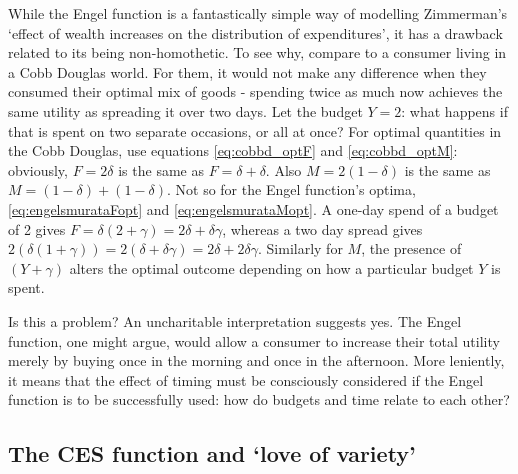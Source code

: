While the Engel function is a fantastically simple way of modelling Zimmerman's `effect of wealth increases on the distribution of expenditures', it has a drawback related to its being non-homothetic.  To see why, compare to a consumer living in a Cobb Douglas world. For them, it would not make any difference when they consumed their optimal mix of goods - spending twice as much now achieves the same utility as spreading it over two days. Let the budget $Y=2$: what happens if that is spent on two separate occasions, or all at once? For optimal quantities in the Cobb Douglas, use equations \eqref{eq:cobbd_optF} and \eqref{eq:cobbd_optM}: obviously, $F=2\delta$ is the same as $F=\delta+\delta$. Also $M=2(1-\delta)$ is the same as $M=(1-\delta)+(1-\delta)$. Not so for the Engel function's optima, \eqref{eq:engelsmurataFopt} and \eqref{eq:engelsmurataMopt}. A one-day spend of a budget of 2 gives $F=\delta(2+\gamma)=2\delta+\delta\gamma$, whereas a two day spread gives $2(\delta(1+\gamma))=2(\delta+\delta\gamma)=2\delta+2\delta\gamma$. Similarly for $M$, the presence of $(Y+\gamma)$ alters the optimal outcome depending on how a particular budget $Y$ is spent.

Is this a problem? An uncharitable interpretation suggests yes. The Engel function, one might argue, would allow a consumer to increase their total utility merely by buying once in the morning and once in the afternoon. More leniently, it means that the effect of timing must be consciously considered if the Engel function is to be successfully used: how do budgets and time relate to each other?


\subsection{The CES function and `love of variety' \label{sec:CESbasics}}




